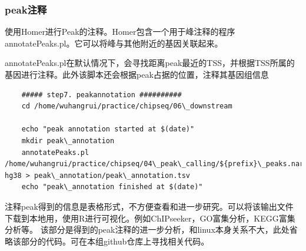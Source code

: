 \subsubsection{peak注释}
使用Homer进行Peak的注释。Homer包含一个用于峰注释的程序annotatePeaks.pl。它可以将峰与其他附近的基因关联起来。\par
annotatePeaks.pl在默认情况下，会寻找距离peak最近的TSS，并根据TSS所属的基因进行注释。此外该脚本还会根据peak占据的位置，注释其基因组信息
\begin{lstlisting}
    ##### step7. peakannotation ##########
    cd /home/wuhangrui/practice/chipseq/06\_downstream

    echo "peak annotation started at $(date)"
    mkdir peak\_annotation
    annotatePeaks.pl /home/wuhangrui/practice/chipseq/04\_peak\_calling/${prefix}\_peaks.narrowPeak hg38 > peak\_annotation/peak\_annotation.tsv
    echo "peak\_annotation finished at $(date)"

\end{lstlisting}
注释peak得到的信息是表格形式，不方便查看和进一步研究。可以将该输出文件下载到本地用，使用R进行可视化。例如ChIPseeker，GO富集分析，KEGG富集分析等。
该部分是得到的peak注释的进一步分析，和linux本身关系不大，此处省略该部分的代码。可在本组github仓库上寻找相关代码。

